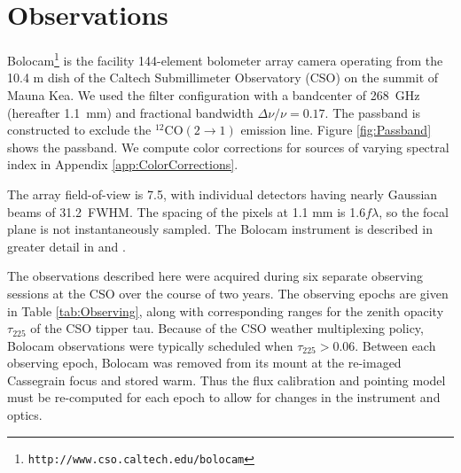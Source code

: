 \documentclass[12pt,preprint]{aastex}
\newcommand{\bcamfwhm}{31.2\arcsec}
\begin{document}
%
\section{Observations}
\label{sec:Observations}


Bolocam\footnote{{\tt http://www.cso.caltech.edu/bolocam}} is the
facility 144-element bolometer array camera operating from the 10.4 m
dish of the Caltech Submillimeter Observatory (CSO) on the summit of
Mauna Kea.  We used the filter configuration with a bandcenter of
268~GHz (hereafter 1.1~mm) and fractional bandwidth $\Delta \nu/\nu =
0.17$.  The passband is constructed to exclude the $^{12}\mathrm{CO}(2
\to 1)$ emission line.  Figure \ref{fig:Passband} shows the passband.
We compute color corrections for sources of varying spectral index in
Appendix \ref{app:ColorCorrections}.

The array field-of-view is 7\arcmin.5, with individual detectors
having nearly Gaussian beams of \bcamfwhm\ FWHM.  The spacing of the
pixels at 1.1 mm is 1.6$f\lambda$, so the focal plane is not
instantaneously sampled.  The Bolocam instrument is described in greater
detail in \citet{haig04} and \citet{glenn03}.


The observations described here were acquired during six separate
observing sessions at the CSO over the course of two years.  The
observing epochs are given in Table \ref{tab:Observing}, along with
corresponding ranges for the zenith opacity $\tau_{225}$ of the CSO
tipper tau.  Because of the CSO weather multiplexing policy, Bolocam
observations were typically scheduled when $\tau_{225} > 0.06$.
Between each observing epoch, Bolocam was removed from its mount at
the re-imaged Cassegrain focus and stored warm.  Thus the flux
calibration and pointing model must be re-computed for each epoch to
allow for changes in the instrument and optics.

\end{document}
